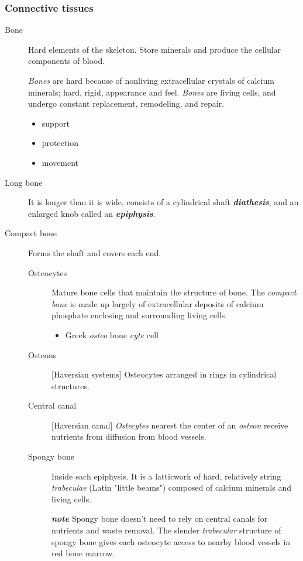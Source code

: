 \documentclass[11pt]{article}
\begin{document}
\subsubsection{Connective tissues}
\label{sec:orgb9b043b}
\begin{description}
\item[{Bone}] Hard elements of the skeleton. Store minerals and produce the
cellular components of blood.

\emph{Bones} are hard because of nonliving extracellular crystals of calcium
 minerals; hard, rigid, appearance and feel. \emph{Bones} are living cells,
 and undergo constant replacement, remodeling, and repair.
\begin{itemize}
\item support
\item protection
\item movement
\end{itemize}
\item[{Long bone}] It is longer than it is wide, consists of a cylindrical
shaft \emph{\textbf{diathesis}}, and an enlarged knob called an \emph{\textbf{epiphysis}}.
\item[{Compact bone}] Forms the shaft and covers each end.
\begin{description}
\item[{Osteocytes}] Mature bone cells that maintain the structure of bone.
The \emph{compact bone} is made up largely of extracellular deposits of
calcium phosphate enclosing and surrounding living cells.
\begin{itemize}
\item Greek \emph{osteo} bone \emph{cyte} cell
\end{itemize}
\item[{Osteons}] [Haversian systems] Osteocytes arranged in rings in
cylindrical structures.
\item[{Central canal}] [Haversian canal] \emph{Ostecytes} nearest the center of an
\emph{osteon} receive nutrients from diffusion from blood vessels.

\item[{Spongy bone}] Inside each epiphysis. It is a latticwork of hard,
relatively string \emph{trabeculae} (Latin "little beams") composed of
calcium minerals and living cells.

\emph{\textbf{note}} Spongy bone doesn't need to rely on central canals for
nutrients and waste removal. The slender \emph{trabecular} structure of
spongy bone gives each osteocyte access to nearby blood vessels in red
bone marrow.


\end{description}
\end{description}
\end{document}
